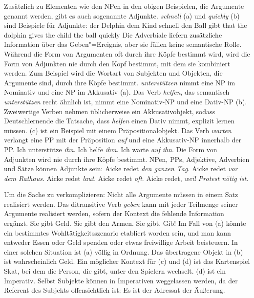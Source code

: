 Zusätzlich zu Elementen wie den NPen in den obigen Beispielen, die Argumente genannt werden,
gibt es auch sogenannte Adjunkte. \emph{schnell} (a) und \emph{quickly} (b)
sind Beispiele für Adjunkte:
\eal
\ex \dass{} der Delphin dem Kind schnell den Ball gibt
\ex that the dolphin gives the child the ball quickly
\zl
Die Adverbiale liefern zusätzliche Information über das Geben"=Ereignis, aber sie füllen keine
semantische Rolle. Während die Form von Argumenten oft durch ihre
Köpfe bestimmt wird, wird die Form von Adjunkten nie durch den Kopf bestimmt, mit dem sie kombiniert werden. Zum Beispiel wird die Wortart
von Subjekten und Objekten, die Argumente sind, durch ihre
Köpfe bestimmt. \emph{unterstützen} nimmt eine NP im Nominativ und eine NP im
Akkusativ (a). Das Verb \emph{helfen}, das semantisch \emph{unterstützen} recht ähnlich ist,
nimmt eine Nominativ-NP und eine Dativ-NP (b). Zweiwertige Verben nehmen üblicherweise ein Akkusativobjekt,
sodass Deutschlernende die Tatsache, dass \emph{helfen} einen
Dativ nimmt, explizit lernen müssen. (c) ist ein Beispiel mit einem Präpositionalobjekt. Das Verb \emph{warten}
verlangt eine PP mit der Präposition \emph{auf} und eine Akkusativ-NP innerhalb der PP.
\eal
\ex Ich unterstütze \emph{ihn}.
\ex Ich helfe \emph{ihm}.
\ex Ich warte \emph{auf} \emph{ihn}.
\zl
Die Form von Adjunkten wird nie durch ihre Köpfe bestimmt. NPen, PPs, Adjektive, Adverbien und Sätze können
Adjunkte sein:
\eal
\ex Aicke redet \emph{den ganzen Tag}.
\ex Aicke redet \emph{vor dem Rathaus}.
\ex Aicke redet \emph{laut}.
\ex Aicke redet \emph{oft}.
\ex Aicke redet, \emph{weil Protest nötig ist}.
\zl

\noindent
Um die Sache zu verkomplizieren: Nicht alle Argumente müssen in einem
Satz realisiert werden.\label{page-optional-arguments} Das ditransitive Verb \emph{geben} kann
mit jeder Teilmenge seiner Argumente realisiert werden, sofern der Kontext die fehlende Information ergänzt.
\eal
\ex Sie gibt Geld.
\ex Sie gibt den Armen.
\ex\label{ex-sie-gibt} Sie gibt.
\ex Gib!
\zl
Im Fall von (a) könnte ein bestimmtes Wohltätigkeitsszenario etabliert worden sein, und man kann entweder
Essen oder Geld spenden oder etwas freiwillige Arbeit beisteuern. In einer solchen Situation ist (a) völlig
in Ordnung. Das übertragene Objekt in (b) ist wahrscheinlich Geld. Ein möglicher Kontext für (c) und
(d) ist das Kartenspiel Skat, bei dem die Person, die gibt, unter den
Spielern wechselt. (d) ist ein Imperativ. Selbst Subjekte können in Imperativen weggelassen werden, da der Referent
des Subjekts offensichtlich ist: Es ist der Adressat der Äußerung.

